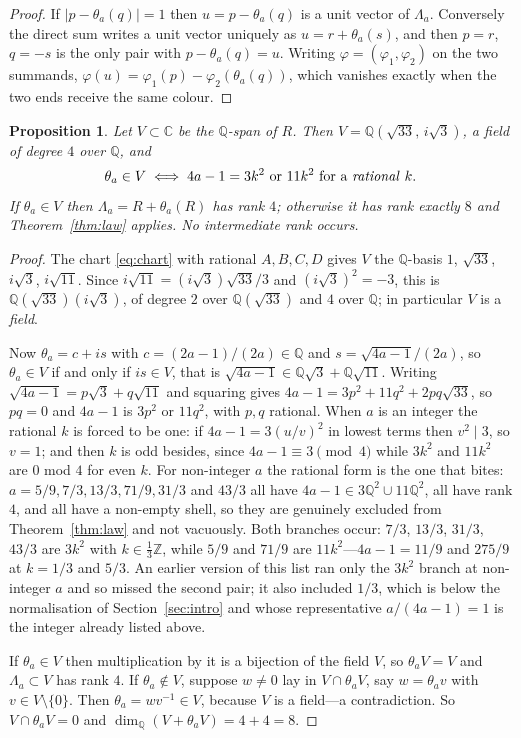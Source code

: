 \documentclass[11pt,reqno]{amsart}
\newcommand{\mc}{$, $}
\newcommand{\mc}{,}
\theoremstyle{plain}
\newtheorem{proposition}[theorem]{Proposition}
\theoremstyle{definition}
\newcommand{\Z}{\mathbb{Z}}
\newcommand{\Q}{\mathbb{Q}}
\newcommand{\C}{\mathbb{C}}
\newcommand{\Lat}{R}
\newcommand{\Lam}{\Lambda}
\begin{document}
\begin{proof}
If $\lvert p - \theta_a(q)\rvert = 1$ then $u = p - \theta_a(q)$ is a unit vector
of $\Lam_a$. Conversely the direct sum writes a unit vector uniquely as
$u = r + \theta_a(s)$, and then $p = r$, $q = -s$ is the only pair with
$p - \theta_a(q) = u$. Writing $\varphi = (\varphi_1,\varphi_2)$ on the two
summands, $\varphi(u) = \varphi_1(p) - \varphi_2(\theta_a(q))$, which vanishes
exactly when the two ends receive the same colour.
\end{proof}


\begin{proposition}\label{prop:rank}
Let $V \subset \C$ be the $\Q$-span of $\Lat$. Then $V = \Q(\sqrt{33},\,i\sqrt3)$,
a field of degree $4$ over $\Q$, and
\[
  \theta_a \in V
  \iff
  4a-1 = 3k^2 \text{ or } 11k^2 \text{ for a \emph{rational} } k.
\]
If $\theta_a \in V$ then $\Lam_a = \Lat + \theta_a(\Lat)$ has rank $4$; otherwise
it has rank exactly $8$ and Theorem~\ref{thm:law} applies. No intermediate rank
occurs.
\end{proposition}
\begin{proof}
The chart \eqref{eq:chart} with rational $A,B,C,D$ gives $V$ the $\Q$-basis
$1\mc \sqrt{33}\mc i\sqrt3\mc i\sqrt{11}$. Since $i\sqrt{11} = (i\sqrt3)\sqrt{33}/3$
and $(i\sqrt3)^2 = -3$, this is $\Q(\sqrt{33})(i\sqrt3)$, of degree $2$ over
$\Q(\sqrt{33})$ and $4$ over $\Q$; in particular $V$ is a \emph{field}.

Now $\theta_a = c + is$ with $c = (2a-1)/(2a) \in \Q$ and
$s = \sqrt{4a-1}/(2a)$, so $\theta_a \in V$ if and only if $is \in V$, that is
$\sqrt{4a-1} \in \Q\sqrt3 + \Q\sqrt{11}$. Writing
$\sqrt{4a-1} = p\sqrt3 + q\sqrt{11}$ and squaring gives
$4a-1 = 3p^2 + 11q^2 + 2pq\sqrt{33}$, so $pq = 0$ and $4a-1$ is $3p^2$ or
$11q^2$, with $p, q$ rational. When $a$ is an integer the rational $k$ is forced
to be one: if $4a-1 = 3(u/v)^2$ in lowest terms then $v^2 \mid 3$, so $v = 1$;
and then $k$ is odd besides, since $4a-1 \equiv 3 \pmod 4$ while $3k^2$ and
$11k^2$ are $0$ mod $4$ for even $k$. For non-integer $a$ the rational form is
the one that bites: $a = 5/9, 7/3, 13/3, 71/9, 31/3$ and $43/3$ all have
$4a-1 \in 3\Q^2 \cup 11\Q^2$, all have rank $4$, and all have a non-empty shell,
so they are genuinely excluded from Theorem~\ref{thm:law} and not vacuously. Both
branches occur: $7/3$, $13/3$, $31/3$, $43/3$ are $3k^2$ with $k \in \tfrac13\Z$,
while $5/9$ and $71/9$ are $11k^2$---$4a-1 = 11/9$ and $275/9$ at $k = 1/3$ and
$5/3$. An earlier version of this list ran only the $3k^2$ branch at non-integer
$a$ and so missed the second pair; it also included $1/3$, which is below the
normalisation of Section~\ref{sec:intro} and whose representative
$a/(4a-1) = 1$ is the integer already listed above.

If $\theta_a \in V$ then multiplication by it is a bijection of the field $V$, so
$\theta_a V = V$ and $\Lam_a \subset V$ has rank $4$. If $\theta_a \notin V$,
suppose $w \ne 0$ lay in $V \cap \theta_a V$, say $w = \theta_a v$ with
$v \in V \setminus \{0\}$. Then $\theta_a = wv^{-1} \in V$, because $V$ is a
field---a contradiction. So $V \cap \theta_a V = 0$ and
$\dim_\Q(V + \theta_a V) = 4 + 4 = 8$.
\end{proof}
\end{document}
